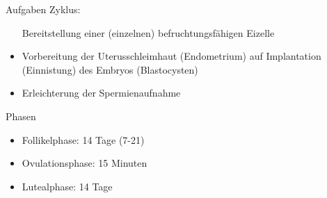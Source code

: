 \documentclass{beamer}
\begin{document}
\begin{frame}
\begin{columns}[c]
\begin{column}{7cm}
\begin{block}{Aufgaben Zyklus:}
\begin{itemize}
 Bereitstellung einer (einzelnen) befruchtungsfähigen Eizelle
\item
 Vorbereitung der Uterusschleimhaut (Endometrium) auf Implantation (Einnistung) des Embryos (Blastocysten)
\item

 Erleichterung der Spermienaufnahme

\end{itemize}
\end{block}


\pause

\begin{block}{Phasen}
\begin{itemize}
\item
Follikelphase: 14 Tage (7-21)
\item 
Ovulationsphase: 15 Minuten 
\item
Lutealphase: 14 Tage

\end{itemize}
\end{block}




\end{column}


\end{columns}

\end{frame}

\end{document}
